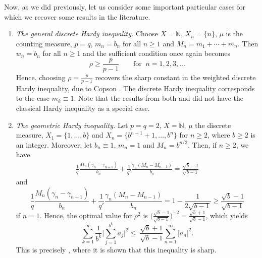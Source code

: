 \documentclass[oneside,10pt]{article}          %
\numberwithin{equation}{section}
\begin{document}
Now, as we did previously, let us consider some important particular cases for which we recover some results in the literature.

\begin{enumerate}

    \item \emph{The general discrete Hardy inequality.} Choose $X=\mathbb{N}$, $X_n=\{n\}$, $\mu$ is the counting measure, $p=q$, $m_n=b_n$ for all $n\geq 1$ and $M_n=m_1+\cdots+m_n$. Then $w_n = b_n$ for all $n\geq 1$ and the sufficient condition once again becomes
    \[
    \rho \geq \frac{p}{p-1} \qquad \text{for }~ n=1,2,3,\dots
    \]
    Hence, choosing $\rho=\frac{p}{p-1}$ recovers the sharp constant in the weighted discrete Hardy inequality, due to Copson \cite{Copson1928}. The discrete Hardy inequality corresponds to the case $m_k\equiv 1$. Note that the results from both \cite{Bouthat2023} and \cite{VincentSohani2025} did not have the classical Hardy inequality as a special case. %

    \item \emph{The geometric Hardy inequality.} Let $p=q=2$, $X=\mathbb{N}$, $\mu$ the discrete measure, $X_1=\{1,\dots,b\}$ and $X_n=\{b^{n-1}+1,\dots,b^{n}\}$ for $n\geq 2$, where $b\geq 2$ is an integer. Moreover, let $b_n\equiv 1$, $m_n=1$ and $M_n = b^{n/2}$. Then, if $n\geq 2$, we have %
    \begin{align*}
        \frac{1}{q}\frac{M_n(\gamma_n-\gamma_{n+1})}{b_n}
    +\frac{1}{q'}\frac{\gamma_n(M_n-M_{n-1})}{b_n} = \frac{\sqrt{b}-1}{\sqrt{b-1}}
    \end{align*}
    and
    \[
    \frac{1}{q}\frac{M_n(\gamma_n-\gamma_{n+1})}{b_n}
    +\frac{1}{q'}\frac{\gamma_n(M_n-M_{n-1})}{b_n} = 1-\frac{1}{2\sqrt{b-1}} \geq \frac{\sqrt{b}-1}{\sqrt{b-1}}
    \]
    if $n=1$. Hence, the optimal value for $\rho^2$ is $\bigl(\frac{\sqrt{b}-1}{\sqrt{b-1}}\bigr)^{-2} = \frac{\sqrt{b}+1}{\sqrt{b}-1}$, which yields
    \begin{equation*}\label{eq - expo}
         \sum_{k=1}^{\infty} \frac{1}{b^k}  \bigg| \sum_{j=1}^{b^k} a_j \bigg|^2
        \leq~
        \frac{\sqrt{b}+1}{\sqrt{b}-1} \sum_{n=1}^{\infty} |a_n|^2.
    \end{equation*}
    This is precisely \cite[Theorem 2]{Bouthat2023}, where it is shown that this inequality is sharp.


\end{enumerate}
\end{document}
